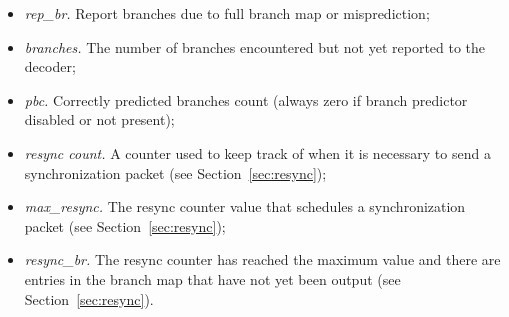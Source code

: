 \begin{itemize}
  \item \textit{rep\_br.} Report branches due to full branch map or misprediction;
  \item \textit{branches.}  The number of branches encountered but not yet reported to the decoder;
  \item \textit{pbc.} Correctly predicted branches count (always zero if branch predictor disabled or not present);
  \item \textit{resync count.} A counter used to keep track of when it is necessary to send 
    a synchronization packet (see Section~\ref{sec:resync});
  \item \textit{max\_resync.}  The resync counter value that schedules a synchronization packet (see Section~\ref{sec:resync});
  \item \textit{resync\_br.} The resync counter has reached the maximum value and there are
    entries in the branch map that have not yet been output (see Section~\ref{sec:resync}).
\end{itemize}

